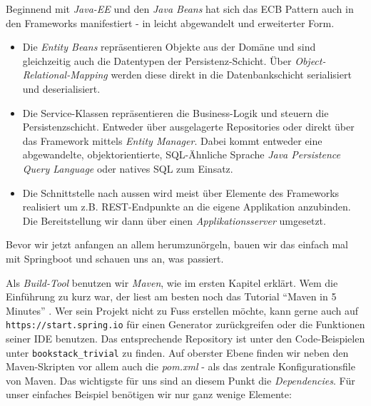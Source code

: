 Beginnend mit \textit{Java-EE} und den \textit{Java Beans} hat sich das ECB
Pattern auch in den Frameworks manifestiert - in leicht abgewandelt und 
erweiterter Form.
\begin{itemize}[resume]
    \item[\textit{Entity}] Die \textit{Entity Beans} repräsentieren Objekte
    aus der Domäne und sind gleichzeitig auch die Datentypen der 
    Persistenz-Schicht. Über \textit{Object-Relational-Mapping} werden diese
    direkt in die Datenbankschicht serialisiert und deserialisiert.
    
    \item[\textit{Controller}] Die Service-Klassen repräsentieren die
    Business-Logik und steuern die Persistenzschicht. Entweder über 
    ausgelagerte Repositories oder direkt über das Framework mittels
    \textit{Entity Manager}. Dabei kommt entweder eine abgewandelte,
    objektorientierte, SQL-Ähnliche Sprache 
    \textit{Java Persistence Query Language} oder natives SQL zum Einsatz.

    \item[\textit{Boundary}] Die Schnittstelle nach aussen wird meist über
    Elemente des Frameworks realisiert um z.B. REST-Endpunkte an die eigene
    Applikation anzubinden. Die Bereitstellung wir dann über einen
    \textit{Applikationsserver} umgesetzt.

\end{itemize}


Bevor wir jetzt anfangen an allem herumzunörgeln, bauen wir das einfach mal
mit Springboot und schauen uns an, was passiert.

Als \textit{Build-Tool} benutzen wir \textit{Maven}, wie im ersten Kapitel
erklärt. Wem die Einführung zu kurz war, der liest am besten noch das Tutorial 
``Maven in 5 Minutes'' \cite{apache2023}. Wer sein Projekt nicht zu Fuss erstellen möchte,
kann gerne auch auf \texttt{https://start.spring.io} für einen Generator
zurückgreifen oder die Funktionen seiner IDE benutzen.
Das entsprechende Repository ist unter den Code-Beispielen unter 
\texttt{bookstack\_trivial}
zu finden. Auf oberster Ebene finden wir neben den Maven-Skripten vor allem 
auch die \textit{pom.xml} - als das zentrale Konfigurationsfile von Maven.
Das wichtigste für uns sind an diesem Punkt die \textit{Dependencies}.
Für unser einfaches Beispiel benötigen wir nur ganz wenige Elemente:

